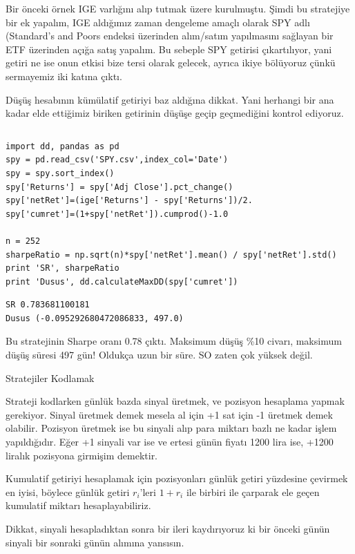 \documentclass[12pt,fleqn]{article}\usepackage{../../common}
\begin{document}
Bir önceki örnek IGE varlığını alıp tutmak üzere kurulmuştu. Şimdi bu
stratejiye bir ek yapalım, IGE aldığımız zaman dengeleme amaçlı olarak SPY
adlı (Standard's and Poors endeksi üzerinden alım/satım yapılmasını
sağlayan bir ETF üzerinden açığa satış yapalım. Bu sebeple SPY getirisi
çıkartılıyor, yani getiri ne ise onun etkisi bize tersi olarak gelecek,
ayrıca ikiye bölüyoruz çünkü sermayemiz iki katına çıktı.

Düşüş hesabının kümülatif getiriyi baz aldığına dikkat. Yani herhangi bir
ana kadar elde ettiğimiz biriken getirinin düşüşe geçip geçmediğini kontrol
ediyoruz.

\inputminted[fontsize=\footnotesize]{python}{dd.py}

\begin{verbatim}
import dd, pandas as pd
spy = pd.read_csv('SPY.csv',index_col='Date')
spy = spy.sort_index()
spy['Returns'] = spy['Adj Close'].pct_change()
spy['netRet']=(ige['Returns'] - spy['Returns'])/2.
spy['cumret']=(1+spy['netRet']).cumprod()-1.0

n = 252 
sharpeRatio = np.sqrt(n)*spy['netRet'].mean() / spy['netRet'].std()
print 'SR', sharpeRatio
print 'Dusus', dd.calculateMaxDD(spy['cumret'])
\end{verbatim}

\begin{verbatim}
SR 0.783681100181
Dusus (-0.095292680472086833, 497.0)
\end{verbatim}

Bu stratejinin Sharpe oranı 0.78 çıktı. Maksimum düşüş \%10 civarı,
maksimum düşüş süresi 497 gün! Oldukça uzun bir süre. SO zaten çok yüksek
değil.

Stratejiler Kodlamak

Strateji kodlarken günlük bazda sinyal üretmek, ve pozisyon hesaplama yapmak
gerekiyor. Sinyal üretmek demek mesela al için +1 sat için -1 üretmek demek
olabilir. Pozisyon üretmek ise bu sinyali alıp para miktarı bazlı ne kadar işlem
yapıldığıdır. Eğer +1 sinyali var ise ve ertesi günün fiyatı 1200 lira ise, +1200
liralık pozisyona girmişim demektir.

Kumulatif getiriyi hesaplamak için pozisyonları günlük getiri yüzdesine çevirmek
en iyisi, böylece günlük getiri $r_i$'leri $1+r_i$ ile birbiri ile çarparak ele
geçen kumulatif miktarı hesaplayabiliriz.

Dikkat, sinyali hesapladıktan sonra bir ileri kaydırıyoruz ki bir önceki günün
sinyali bir sonraki günün alımına yansısın.
\end{document}
